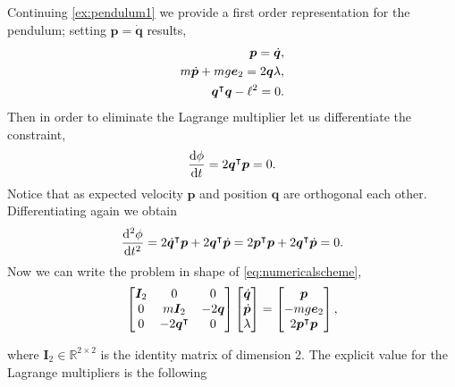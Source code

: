 		\begin{example}
			\label{ex:pendulum2}
			Continuing \cref{ex:pendulum1} we provide a first order representation for the pendulum; setting $\bm{p} = \dot{\bm{q}}$ results, 
			\begin{subequations}
				\begin{align*}
					\bm{p} = \dot{\bm{q}},\\
					m\dot{\bm{p}} + mg\bm{e}_{2} = 2\bm{q}\lambda,\\
					\bm{q}^{\intercal}\bm{q} - \ell^{2} = 0.
				\end{align*}
			\end{subequations}
			Then in order to eliminate the Lagrange multiplier let us differentiate the constraint, 
			\begin{equation*}
				\frac{\mathop{}\!\mathrm{d}\phi}{\mathop{}\!\mathrm{d} t} = 2\bm{q}^{\intercal}\bm{p} = 0.
			\end{equation*}
			Notice that as expected velocity $\bm{p}$ and position $\bm{q}$ are orthogonal each other. Differentiating again we obtain 
			\begin{equation*}
				\frac{\mathop{}\!\mathrm{d}^{2}\phi}{\mathop{}\!\mathrm{d} t^2} = 2\dot{\bm{q}}^{\intercal}\bm{p} + 2\bm{q}^{\intercal}\dot{\bm{p}} = 2\bm{p}^{\intercal}\bm{p} + 2\bm{q}^{\intercal}\dot{\bm{p}} = 0.
			\end{equation*}
			Now we can write the problem in shape of \cref{eq:numericalscheme}, 
			\begin{equation}
				\label{eq:numericalschemependulum}
				\begin{bmatrix}
					\bm{I}_{2} 	& 0 & 0 \\
					0 			& m\bm{I}_{2} & -2\bm{q} \\ 
					0 			& -2\bm{q}^{\intercal}  & 0
				\end{bmatrix}
				\begin{bmatrix}
					\dot{\bm{q}} \\
					\dot{\bm{p}} \\
					\lambda
				\end{bmatrix}
				= 
				\begin{bmatrix}
					\bm{p} \\
					-mg\bm{e}_{2}\\
					2\bm{p}^{\intercal}\bm{p}
				\end{bmatrix},
			\end{equation}
		\end{example}
		where $\bm{I}_{2}\in\mathbb{R}^{2\times 2}$ is the identity matrix of dimension 2. The explicit value for the Lagrange multipliers is the following
